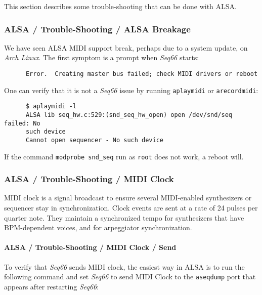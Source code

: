    This section describes some trouble-shooting that can be done with ALSA.

\subsubsection{ALSA / Trouble-Shooting / ALSA Breakage}
\label{subsubsec:alsa_testing_alsa_breakage}

   We have seen ALSA MIDI support break, perhaps due to a system update, on
   \textsl{Arch Linux}.
   The first symptom is a prompt when \textsl{Seq66} starts:

   \begin{verbatim}
      Error.  Creating master bus failed; check MIDI drivers or reboot
   \end{verbatim}

   One can verify that it is not a \textsl{Seq66} issue by running
   \texttt{aplaymidi} or \texttt{arecordmidi}:

   \begin{verbatim}
      $ aplaymidi -l
      ALSA lib seq_hw.c:529:(snd_seq_hw_open) open /dev/snd/seq failed: No
      such device
      Cannot open sequencer - No such device
   \end{verbatim}

   If the command \texttt{modprobe snd\_seq} run as \texttt{root} does
   not work, a reboot will.

\subsubsection{ALSA / Trouble-Shooting / MIDI Clock}
\label{subsubsec:alsa_testing_midi_clock}

   MIDI clock is a signal broadcast to ensure
   several MIDI-enabled synthesizers or sequencer stay in
   synchronization. Clock events are sent at a rate of 24 pulses per quarter
   note.  They maintain a synchronized tempo for synthesizers
   that have BPM-dependent voices, and for arpeggiator synchronization.

\paragraph{ALSA / Trouble-Shooting / MIDI Clock / Send}
\label{paragraph:alsa_testing_midi_clock_send}

   To verify that \textsl{Seq66} sends MIDI clock, the easiest way in
   ALSA is to run the following command and set \textsl{Seq66} to send
   MIDI Clock to the \texttt{aseqdump} port that appears after restarting
   \textsl{Seq66}:


